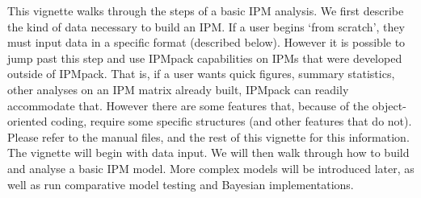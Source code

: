 \documentclass{article}
\begin{document}
This vignette walks through the steps of a basic IPM analysis.  We first
describe the kind of data necessary to build an IPM.  If a user begins `from
scratch', they must input data in a specific format (described below).  However
it is possible to jump past this step and use IPMpack capabilities on IPMs that
were developed outside of IPMpack. That is, if a user wants quick figures, summary statistics, other analyses on an IPM matrix already built, IPMpack can readily accommodate that.   However there are some features that, because of the object-oriented coding, require some specific structures (and other features that do not).  Please refer to the manual files, and the rest of this vignette for this information. The vignette will begin with data input.  We will then walk through how to build and analyse a basic IPM model.  More complex models will be introduced later, as well as run comparative model testing and Bayesian implementations.
\end{document}
